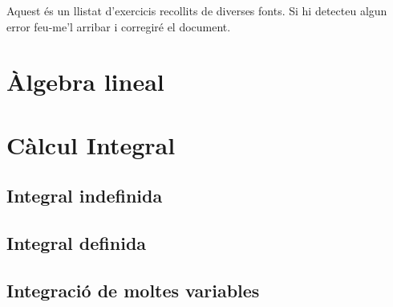 \documentclass[12pt]{article}
\begin{document}
Aquest és un llistat d'exercicis recollits de diverses fonts. Si hi detecteu algun error feu-me'l arribar i corregiré el document.
%
\begin{ExerciseList}

\section{Àlgebra lineal}













%


















%
% 
% 
% 
% 
% 






\section{Càlcul Integral}

\subsection{Integral indefinida}









\subsection{Integral definida}




\subsection{Integració de moltes variables}




\end{ExerciseList}
\end{document}
